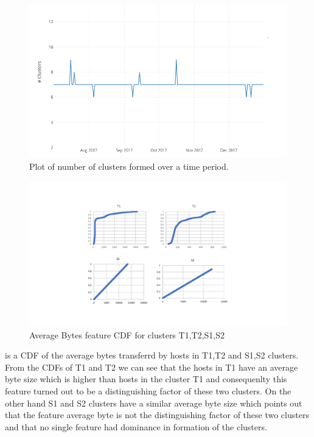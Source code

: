 \begin{figure}[t]
	\centerline{\includegraphics{constant.png}}
	\caption{ Plot of number of clusters formed over a time period.}%
\end{figure}


\begin{figure}[t]
	\centerline{\includegraphics[trim=2cm 2cm 2cm 2cm, scale = 0.7]{bytes_cdf.pdf}}
	\caption{ Average Bytes feature CDF for clusters T1,T2,S1,S2}%
\end{figure}

 is a CDF of the average bytes transferrd by hosts in T1,T2 and S1,S2 clusters. From the CDFs of T1 and T2 we can see that the hosts in T1 have an average byte size which is higher than hosts in the cluster T1 and consequenlty this feature turned out to be a distinguishing factor of these two clusters. On the other hand S1 and S2 clusters have a similar average byte size which points out that the feature average byte is not the distinguishing factor of these two clusters and that no single feature had dominance in formation of the clusters.

